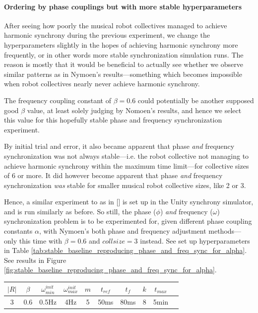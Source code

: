 		
		\paragraph{Ordering by phase couplings but with more stable hyperparameters}
		
		After seeing how poorly the musical robot collectives managed to achieve harmonic synchrony during the previous experiment, we change the hyperparameters slightly in the hopes of achieving harmonic synchrony more frequently, or in other words more stable synchronization simulation runs. The reason is mostly that it would be beneficial to actually see whether we observe similar patterns as in Nymoen's results—something which becomes impossible when robot collectives nearly never achieve harmonic synchrony.
		
		The frequency coupling constant of $\beta=0.6$ could potentially be another supposed good $\beta$ value, at least solely judging by Nomoen's results, and hence we select this value for this hopefully stable phase and frequency synchronization experiment.
		
		By initial trial and error, it also became apparent that phase \textit{and} frequency synchronization was not always stable—i.e. the robot collective not managing to achieve harmonic synchrony within the maximum time limit—for collective sizes of 6 or more. It did however become apparent that phase \textit{and} frequency synchronization \textit{was} stable for smaller musical robot collective sizes, like 2 or 3.
		
		Hence, a similar experiment to as in [] is set up in the Unity synchrony simulator, and is run similarly as before. So still, the phase ($\phi$) \textit{and} frequency ($\omega$) synchronization problem is to be experimented for, given different phase coupling constants $\alpha$, with Nymoen's both phase and frequency adjustment methods—only this time with $\beta=0.6$ and $collsize=3$ instead. See set up hyperparameters in Table \ref{tab:stable_baseline_reproducing_phase_and_freq_sync_for_alpha}. See results in Figure \ref{fig:stable_baseline_reproducing_phase_and_freq_sync_for_alpha}.
		
		\begin{center}
		\begin{tabular}{ |c|c|c|c|c|c|c|c|c|c| } 
		\hline
		$|R|$ & $\beta$ & $\omega_{min}^{init}$ & $\omega_{max}^{init}$ & $m$ & $t_{ref}$ & $t_f$ & $k$ & $t_{max}$ \\
		\hline
		3 & 0.6 & 0.5Hz & 4Hz & 5 & 50ms & 80ms & 8 & 5min \\
		\hline
		\end{tabular}
		\label{tab:stable_baseline_reproducing_phase_and_freq_sync_for_alpha}
		\end{center}
		
